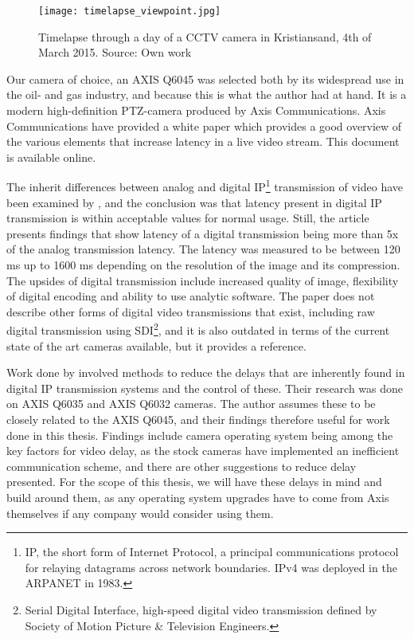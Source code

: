 \begin{figure}[ht]
    \centering
    \texttt{[image: timelapse\_viewpoint.jpg]}
    \caption{Timelapse through a day of a CCTV camera in Kristiansand, 4th of March 2015. Source: Own work}
    \label{fig:timelapse_viewpoint}
\end{figure}
\FloatBarrier

Our camera of choice, an AXIS Q6045 was selected both by its widespread use in the oil- and gas industry, and because this is what the author had at hand. It is a modern high-definition PTZ-camera produced by Axis Communications.  Axis Communications have provided a white paper which provides a good overview of the various elements that increase latency in a live video stream. This document is available online. \citep{axis15}

The inherit differences between analog and digital IP\footnote{IP, the short form of Internet Protocol, a principal communications protocol for relaying datagrams across network boundaries. IPv4 was deployed in the ARPANET in 1983.} transmission of video have been examined by \citet{hill09}, and the conclusion was that latency present in digital IP transmission is within acceptable values for normal usage. Still, the article presents findings that show latency of a digital transmission being more than 5x of the analog transmission latency. The latency was measured to be between 120 ms up to 1600 ms depending on the resolution of the image and its compression. The upsides of digital transmission include increased quality of image, flexibility of digital encoding and ability to use analytic software. The paper does not describe other forms of digital video transmissions that exist, including raw digital transmission using SDI\footnote{Serial Digital Interface, high-speed digital video transmission defined by Society of Motion Picture \& Television Engineers.}, and it is also outdated in terms of the current state of the art cameras available, but it provides a reference.

Work done by \citet{svensson13} involved methods to reduce the delays that are inherently found in digital IP transmission systems and the control of these. Their research was done on AXIS Q6035 and AXIS Q6032 cameras. The author assumes these to be closely related to the AXIS Q6045, and their findings therefore useful for work done in this thesis. Findings include camera operating system being among the key factors for video delay, as the stock cameras have implemented an inefficient communication scheme, and there are other suggestions to reduce delay presented. For the scope of this thesis, we will have these delays in mind and build around them, as any operating system upgrades have to come from Axis themselves if any company would consider using them.

